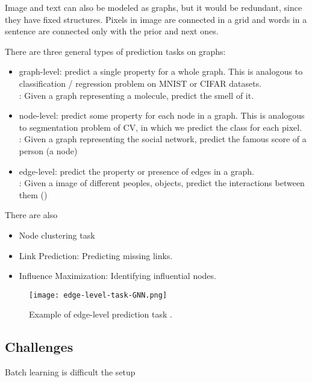 Image and text can also be modeled as graphs, but it would be redundant, since they have fixed structures. Pixels in image are connected in a grid and words in a sentence are connected only with the prior and next ones.

There are three general types of prediction tasks on graphs: \cite{sanchez2021a}
\begin{itemize}
	\item graph-level: predict a single property for a whole graph. This is analogous to classification / regression problem on MNIST or CIFAR datasets.\\
	\Eg: Given a graph representing a molecule, predict the smell of it.
	\item node-level: predict some property for each node in a graph. This is analogous to segmentation problem of \ac{CV}, in which we predict the class for each pixel.\\
	\Eg: Given a graph representing the social network, predict the famous score of a person (a node)
	\item edge-level: predict the property or presence of edges in a graph.\\
	\Eg: Given a image of different peoples, objects, predict the interactions between them ()
\end{itemize}

There are also
\begin{itemize}
	\item Node clustering task
	\item Link Prediction: Predicting missing links.
	\item Influence Maximization: Identifying influential nodes.
\end{itemize}

\begin{figure}[hbt!]
	\centering
	\texttt{[image: edge-level-task-GNN.png]}
	\caption{Example of edge-level prediction task \cite{sanchez2021a}.}
	\label{fig:edge-level-task-GNN}
\end{figure}

\subsection{Challenges}
\note Batch learning is difficult the setup

